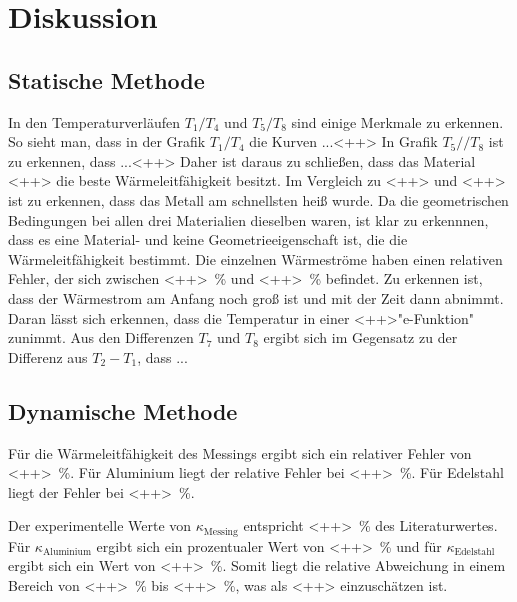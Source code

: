\section{Diskussion}
\label{sec:Diskussion}

\subsection{Statische Methode}
In den Temperaturverläufen $T_1/T_4$ und $T_5/T_8$ sind einige Merkmale zu erkennen. 
So sieht man, dass in der Grafik $T_1/T_4$ die Kurven ...<++>
In Grafik $T_5//T_8$ ist zu erkennen, dass ...<++>
Daher ist daraus zu schließen, dass das Material <++> die beste Wärmeleitfähigkeit besitzt. 
Im Vergleich zu <++> und <++> ist zu erkennen, dass das Metall am schnellsten heiß wurde. Da die geometrischen 
Bedingungen bei allen drei Materialien dieselben waren, ist klar zu erkennnen, dass es eine Material- und keine
Geometrieeigenschaft ist, die die Wärmeleitfähigkeit bestimmt. 
Die einzelnen Wärmeströme haben einen relativen Fehler, der sich zwischen \SI{<++>}{\percent} und \SI{<++>}{\percent} befindet. 
Zu erkennen ist, dass der Wärmestrom am Anfang noch groß ist und mit der Zeit dann abnimmt. Daran lässt sich erkennen, dass die Temperatur 
in einer <++>"e-Funktion" zunimmt.  
Aus den Differenzen $T_7$ und $T_8$ ergibt sich im Gegensatz zu der Differenz aus $T_2-T_1$, dass ...


\subsection{Dynamische Methode}
Für die Wärmeleitfähigkeit des Messings ergibt sich ein relativer Fehler von \SI{<++>}{\percent}. Für Aluminium liegt der relative 
Fehler bei \SI{<++>}{\percent}. Für Edelstahl liegt der Fehler bei \SI{<++>}{\percent}. 

\noindent Der experimentelle Werte von $\kappa_\text{Messing}$ entspricht \SI{<++>}{\percent} des Literaturwertes. 
Für $\kappa_\text{Aluminium}$ ergibt sich ein prozentualer Wert von \SI{<++>}{\percent} und für $\kappa_\text{Edelstahl}$ ergibt sich ein Wert 
von \SI{<++>}{\percent}. 
Somit liegt die relative Abweichung in einem Bereich von \SI{<++>}{\percent} bis \SI{<++>}{\percent}, was als <++> einzuschätzen ist. 



